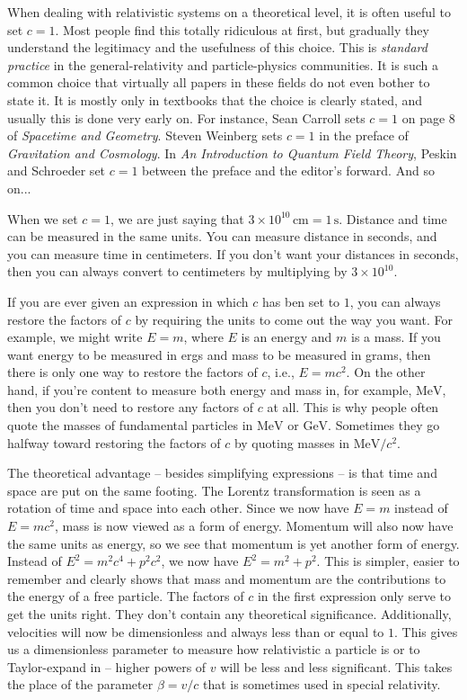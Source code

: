 \documentclass{article}
\begin{document}
When dealing with relativistic systems on a theoretical level, it is often useful to set $c = 1$. Most people find this totally ridiculous at first, but gradually they understand the legitimacy and the usefulness of this choice. This is \emph{standard practice} in the general-relativity and particle-physics communities. It is such a common choice that virtually all papers in these fields do not even bother to state it. It is mostly only in textbooks that the choice is clearly stated, and usually this is done very early on. For instance, Sean Carroll sets $c = 1$ on page 8 of \emph{Spacetime and Geometry}. Steven Weinberg sets $c = 1$ in the preface of \emph{Gravitation and Cosmology}. In \emph{An Introduction to Quantum Field Theory}, Peskin and Schroeder set $c = 1$ between the preface and the editor's forward. And so on...

When we set $c=1$, we are just saying that $3 \times 10^{10} \, \mathrm{cm} = 1 \, \mathrm{s}$. Distance and time can be measured in the same units. You can measure distance in seconds, and you can measure time in centimeters. If you don't want your distances in seconds, then you can always convert to centimeters by multiplying by $3 \times 10^{10}$.

If you are ever given an expression in which $c$ has ben set to $1$, you can always restore the factors of $c$ by requiring the units to come out the way you want. For example, we might write $E = m$, where $E$ is an energy and $m$ is a mass. If you want energy to be measured in ergs and mass to be measured in grams, then there is only one way to restore the factors of $c$, i.e., $E = m c^2$. On the other hand, if you're content to measure both energy and mass in, for example, $\mathrm{MeV}$, then you don't need to restore any factors of $c$ at all. This is why people often quote the masses of fundamental particles in $\mathrm{MeV}$ or $\mathrm{GeV}$. Sometimes they go halfway toward restoring the factors of $c$ by quoting masses in $\mathrm{MeV} / c^2$.

The theoretical advantage -- besides simplifying expressions -- is that time and space are put on the same footing. The Lorentz transformation is seen as a rotation of time and space into each other. Since we now have $E = m$ instead of $E = m c^2$, mass is now viewed as a form of energy. Momentum will also now have the same units as energy, so we see that momentum is yet another form of energy. Instead of $E^2 = m^2 c^4 + p^2 c^2$, we now have $E^2 = m^2 + p^2$. This is simpler, easier to remember and clearly shows that mass and momentum are the contributions to the energy of a free particle. The factors of $c$ in the first expression only serve to get the units right. They don't contain any theoretical significance. Additionally, velocities will now be dimensionless and always less than or equal to $1$. This gives us a dimensionless parameter to measure how relativistic a particle is or to Taylor-expand in -- higher powers of $v$ will be less and less significant. This takes the place of the parameter $\beta = v/c$ that is sometimes used in special relativity.
\end{document}
